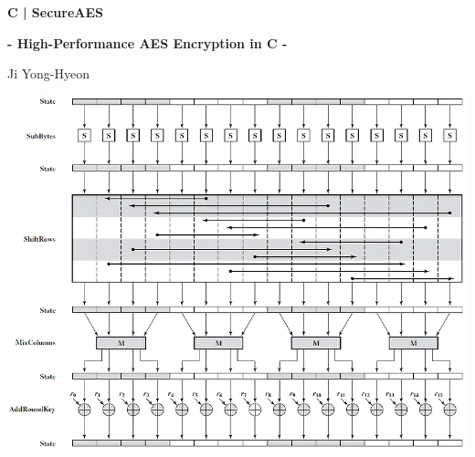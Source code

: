 \documentclass[12pt,openany]{book}
\theoremstyle{definition}
\begin{document}
	
	\begin{titlepage}
		\begin{center}
			{\Huge\textsf{\textbf{C | SecureAES}}\par}
			{\Large\textsf{\textbf{- High-Performance AES Encryption in C -}}\par}
			\vspace{0.5in}
			{\Large {Ji Yong-Hyeon}\par}
			\vspace{1in}
%				
%				
%				
%				
			\includegraphics[scale=.6]{images/AES_Encryption_Round.png}\par

\end{center}
\end{titlepage}
\end{document}
